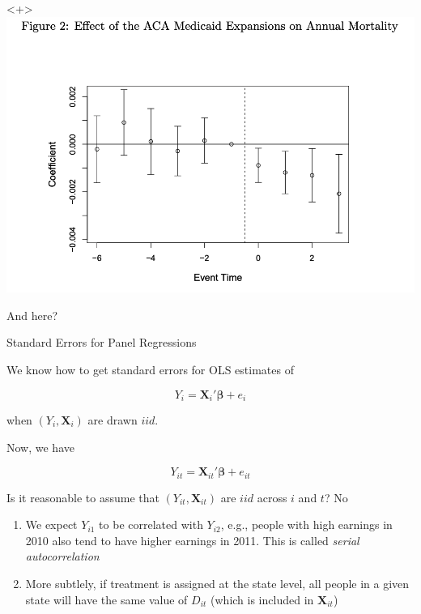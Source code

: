 \documentclass[11pt,english,handout]{beamer}
\newenvironment{wideitemize}{\itemize\addtolength{\itemsep}{10pt}}{\enditemize}
\begin{document}
\begin{frame}
\begin{onlyenv}<+>
	\centering
	\includegraphics[width = 0.6 \linewidth]{medicaid-mortality}
	\begin{wideitemize}
		\item
		And here?  
	\end{wideitemize}
\end{onlyenv}

\end{frame}

\begin{frame}{Standard Errors for Panel Regressions}
\begin{wideitemize}
	\item
	We know how to get standard errors for OLS estimates of 
	
	$$Y_i = \bm{X}_i'\bm{\beta} + e_i$$
	
	\noindent when $(Y_i,\bm{X}_i)$ are drawn $iid$.
	
	\pause
	\item
	Now, we have 
	
		$$Y_{it} = \bm{X}_{it}'\bm{\beta} + e_{it}$$
		
	\pause
	\item
	Is it reasonable to assume that $(Y_{it}, \bm{X}_{it})$ are $iid$ across $i$ and $t$? \pause{} No
	
	\pause
	\begin{enumerate}
		\item 
		We expect $Y_{i1}$ to be correlated with $Y_{i2}$, e.g., people with high earnings in 2010 also tend to have higher earnings in 2011. This is called \emph{serial autocorrelation} 
		
		\pause
		\item
		More subtlely, if treatment is assigned at the state level, all people in a given state will have the same value of $D_{it}$ (which is included in $\bm{X}_{it}$)
	\end{enumerate}


\end{wideitemize}
\end{frame}
\end{document}
